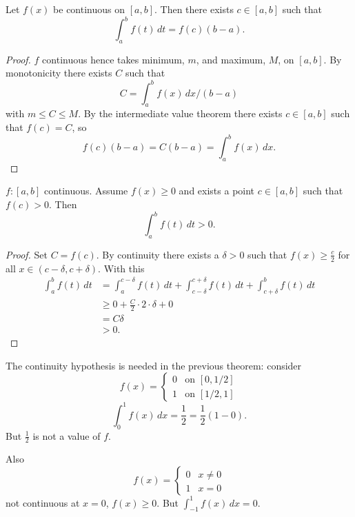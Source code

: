 \documentclass[10pt, a4paper]{article}
\begin{document}
\begin{theorem}
    Let $f(x)$ be continuous on $[a, b]$.
    Then there exists $c \in [a, b]$ such that
    \[
    \int_{a}^{b}f(t)\,dt = f(c)(b - a).
    \]
    
    \begin{proof}
        $f$ continuous hence takes minimum,
        $m$,
        and maximum,
        $M$,
        on $[a, b]$.
        By monotonicity there exists $C$ such that
        \[
        C = \int_{a}^{b}f(x)\,dx / (b - a)
        \]
        with $m \leq C \leq M$.
        By the intermediate value theorem there exists $c \in [a, b]$ such that $f(c) = C$,
        so
        \[
        f(c)(b - a) = C(b - a) = \int_{a}^{b}f(x)\,dx.
        \]
    \end{proof}
\end{theorem}

\begin{theorem}
    $f : [a, b]$ continuous.
    Assume $f(x) \geq 0$ and exists a point $c \in [a, b]$ such that $f(c) > 0$.
    Then
    \[
    \int_{a}^{b}f(t)\,dt > 0.
    \]
    
    \begin{proof}
        Set $C = f(c)$.
        By continuity there exists a $\delta > 0$ such that $f(x) \geq \frac{c}{2}$ for all $x \in (c - \delta, c + \delta)$.
        With this
        \begin{align*}
            \int_{a}^{b}f(t)\,dt &= \int_{a}^{c - \delta}f(t)\,dt + \int_{c - \delta}^{c + \delta}f(t)\,dt + \int_{c + \delta}^{b}f(t)\,dt \\
            &\geq 0 + \frac{C}{2}\cdot 2\cdot \delta + 0 \\
            &= C\delta \\
            &> 0.
        \end{align*}
    \end{proof}
\end{theorem}


The continuity hypothesis is needed in the previous theorem:
consider
\[
f(x) = \begin{cases}
    0 & \text{on } [0, 1 / 2] \\
    1 & \text{on } [1 / 2, 1]
\end{cases}
\]
\[
\int_{0}^{1}f(x)\,dx = \frac{1}{2} = \frac{1}{2}(1 - 0).
\]
But $\frac{1}{2}$ is not a value of $f$.

Also
\[
f(x) = \begin{cases}
    0 & x \neq 0 \\
    1 & x = 0
\end{cases}
\]
not continuous at $x = 0$,
$f(x) \geq 0$.
But $\int_{-1}^{1}f(x)\,dx = 0$.
\end{document}
